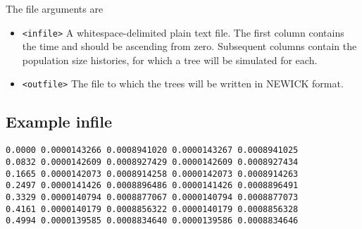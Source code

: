 \documentclass[12pt]{article}
\begin{document}
The file arguments are

\begin{itemize}
\item \texttt{<infile>}  A whitespace-delimited plain text file. The first column contains the time and should be ascending from zero. Subsequent columns contain the population size histories, for which a tree will be simulated for each.
\item \texttt{<outfile>} The file to which the trees will be written in NEWICK format.
\end{itemize}

\subsection*{Example infile}

\begin{verbatim}
0.0000 0.0000143266 0.0008941020 0.0000143267 0.0008941025
0.0832 0.0000142609 0.0008927429 0.0000142609 0.0008927434
0.1665 0.0000142073 0.0008914258 0.0000142073 0.0008914263
0.2497 0.0000141426 0.0008896486 0.0000141426 0.0008896491
0.3329 0.0000140794 0.0008877067 0.0000140794 0.0008877073
0.4161 0.0000140179 0.0008856322 0.0000140179 0.0008856328
0.4994 0.0000139585 0.0008834640 0.0000139586 0.0008834646
\end{verbatim}
\end{document}
